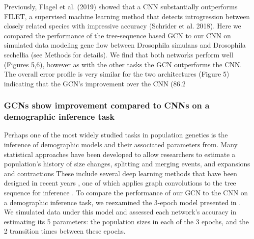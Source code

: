 Previously, Flagel et al. (2019) showed that a CNN substantially outperforms FILET, a supervised machine learning method that detects introgression between closely related species with impressive accuracy (Schrider et al. 2018). Here we compared the performance of the tree-sequence based GCN to our CNN on simulated data modeling gene flow between Drosophila simulans and Drosophila sechellia (see Methods for details). We find that both networks perform well (Figures 5,6), however as with the other tasks the GCN outperforms the CNN. The overall error profile is very similar for the two architectures (Figure 5) indicating that the GCN’s improvement over the CNN (86.2%

\subsubsection{GCNs show improvement compared to CNNs on a demographic inference task}

Perhaps one of the most widely studied tasks in population genetics is the inference of demographic models and their associated parameters from. Many statistical approaches have been developed to allow researchers to estimate a population’s history of size changes, splitting and merging events, and expansions and contractions \cite{browningAccurateNonparametricEstimation2015,excoffierFastsimcoal2DemographicInference2021,gutenkunstInferringJointDemographic2009,gutenkunstInferringJointDemographic2009,gutenkunstDiffusionApproximationsDemographic2010,kammEfficientlyInferringDemographic2020,liInferenceHumanPopulation2011,santiagoRecentDemographicHistory2020,terhorstRobustScalableInference2017} These include several deep learning methods that have been designed in recent years \cite{sanchezDeepLearningPopulation2021,wangAutomaticInferenceDemographic2021}, one of which applies graph convolutions to the tree sequence for inference \cite{korfmannSimultaneousInferenceDemography2023}. To compare the performance of our GCN to the CNN on a demographic inference task, we reexamined the 3-epoch model presented in \cite{flagelUnreasonableEffectivenessConvolutional2019}. We simulated data under this model and assessed each network’s accuracy in estimating its 5 parameters: the population sizes in each of the 3 epochs, and the 2 transition times between these epochs. 

